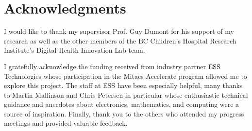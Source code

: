 
\chapter{Acknowledgments}

I would like to thank my supervisor Prof. Guy Dumont for his support of my research as well as the other members of the BC Children's Hospital Research Institute's Digital Health Innovation Lab team.

I gratefully acknowledge the funding received from industry partner ESS Technologies whose participation in the Mitacs Accelerate program allowed me to explore this project. The staff at ESS have been especially helpful, many thanks to Martin Mallinson and Chris Petersen in particular whose enthusiastic technical guidance and anecdotes about electronics, mathematics, and computing were a source of inspiration. Finally, thank you to the others who attended my progress meetings and provided valuable feedback.
